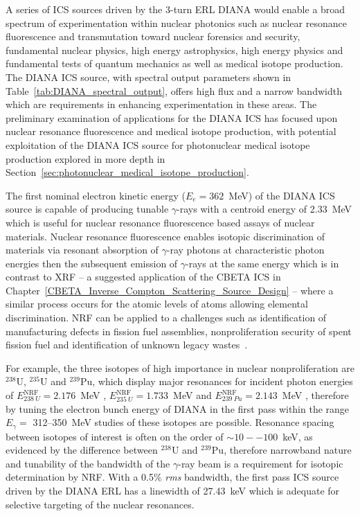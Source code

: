 \documentclass[../main.tex]{subfiles}
\begin{document}
A series of ICS sources driven by the 3-turn ERL DIANA would enable a broad spectrum of experimentation within nuclear photonics \cite{nedorezov2017nuclear} such as nuclear resonance fluorescence and transmutation toward nuclear forensics and security, fundamental nuclear physics, high energy astrophysics, high energy physics and fundamental tests of quantum mechanics as well as medical isotope production. The DIANA ICS source, with spectral output parameters shown in Table~\ref{tab:DIANA_spectral_output}, offers high flux and a narrow bandwidth which are requirements in enhancing experimentation in these areas. The preliminary examination of applications for the DIANA ICS has focused upon nuclear resonance fluorescence and medical isotope production, with potential exploitation of the DIANA ICS source for photonuclear medical isotope production explored in more depth in Section~\ref{sec:photonuclear_medical_isotope_production}.  

The first nominal electron kinetic energy ($E_{e} = 362$~\si{\mega\electronvolt}) of the DIANA ICS source is capable of producing tunable $\gamma$-rays with a centroid energy of 2.33~\si{\mega\electronvolt} which is useful for nuclear resonance fluorescence based assays of nuclear materials. Nuclear resonance fluorescence enables isotopic discrimination of materials via resonant absorption of $\gamma$-ray photons at characteristic photon energies then the subsequent emission of $\gamma$-rays at the same energy which is in contrast to XRF -- a suggested application of the CBETA ICS in Chapter~\ref{CBETA_Inverse_Compton_Scattering_Source_Design} -- where a similar process occurs for the atomic levels of atoms allowing elemental discrimination. NRF can be applied to a challenges such as identification of manufacturing defects in fission fuel assemblies, nonproliferation security of spent fission fuel and identification of unknown legacy wastes~\cite{angal2018perle,angell2015demonstration,bolind2015states,geddes2017impact,kwan2011discrete}.

For example, the three isotopes of high importance in nuclear nonproliferation are $^{238}\mathrm{U}$, $^{235}\mathrm{U}$ and $^{239}\mathrm{Pu}$, which display major resonances for incident photon energies of $E_{238~U}^{\mathrm{NRF}} = 2.176$~\si{\mega\electronvolt} \cite{quiter2011transmission},  $E_{235~U}^{\mathrm{NRF}} = 1.733$~\si{\mega\electronvolt} and  $E_{239~Pu}^{\mathrm{NRF}} = 2.143$~\si{\mega\electronvolt} \cite{hayakawa2010nondestructive}, therefore by tuning the electron bunch energy of DIANA in the first pass within the range $E_{\gamma} =$ 312--350~\si{\mega\electronvolt} studies of these isotopes are possible. Resonance spacing between isotopes of interest is often on the order of $\sim10--100$~\si{\kilo\electronvolt}, as evidenced by the difference between $^{238}\mathrm{U}$ and $^{239}\mathrm{Pu}$, therefore narrowband nature and tunability of the bandwidth of the $\gamma$-ray beam is a requirement for isotopic determination by NRF. With a 0.5\% \textit{rms} bandwidth, the first pass ICS source driven by the DIANA ERL has a linewidth of 27.43~\si{\kilo\electronvolt} which is adequate for selective targeting of the nuclear resonances.    
\end{document}

